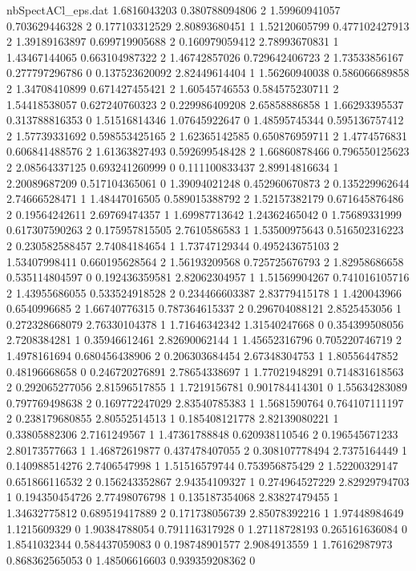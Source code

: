 \begin{filecontents}{nbSpectACl_eps.dat}
1.6816043203 0.380788094806 2
1.59960941057 0.703629446328 2
0.177103312529 2.80893680451 1
1.52120605799 0.477102427913 2
1.39189163897 0.699719905688 2
0.160979059412 2.78993670831 1
1.43467144065 0.663104987322 2
1.46742857026 0.729642406723 2
1.73533856167 0.277797296786 0
0.137523620092 2.82449614404 1
1.56260940038 0.586066689858 2
1.34708410899 0.671427455421 2
1.60545746553 0.584575230711 2
1.54418538057 0.627240760323 2
0.229986409208 2.65858886858 1
1.66293395537 0.313788816353 0
1.51516814346 1.07645922647 0
1.48595745344 0.595136757412 2
1.57739331692 0.598553425165 2
1.62365142585 0.650876959711 2
1.4774576831 0.606841488576 2
1.61363827493 0.592699548428 2
1.66860878466 0.796550125623 2
2.08564337125 0.693241260999 0
0.111100833437 2.89914816634 1
2.20089687209 0.517104365061 0
1.39094021248 0.452960670873 2
0.135229962644 2.74666528471 1
1.48447016505 0.589015388792 2
1.52157382179 0.671645876486 2
0.19564242611 2.69769474357 1
1.69987713642 1.24362465042 0
1.75689331999 0.617307590263 2
0.175957815505 2.7610586583 1
1.53500975643 0.516502316223 2
0.230582588457 2.74084184654 1
1.73747129344 0.495243675103 2
1.53407998411 0.660195628564 2
1.56193209568 0.725725676793 2
1.82958686658 0.535114804597 0
0.192436359581 2.82062304957 1
1.51569904267 0.741016105716 2
1.43955686055 0.533524918528 2
0.234466603387 2.83779415178 1
1.420043966 0.6540996685 2
1.66740776315 0.787364615337 2
0.296704088121 2.8525453056 1
0.272328668079 2.76330104378 1
1.71646342342 1.31540247668 0
0.354399508056 2.7208384281 1
0.35946612461 2.82690062144 1
1.45652316796 0.705220746719 2
1.4978161694 0.680456438906 2
0.206303684454 2.67348304753 1
1.80556447852 0.48196668658 0
0.246720276891 2.78654338697 1
1.77021948291 0.714831618563 2
0.292065277056 2.81596517855 1
1.7219156781 0.901784414301 0
1.55634283089 0.797769498638 2
0.169772247029 2.83540785383 1
1.5681590764 0.764107111197 2
0.238179680855 2.80552514513 1
0.185408121778 2.82139080221 1
0.33805882306 2.7161249567 1
1.47361788848 0.620938110546 2
0.196545671233 2.80173577663 1
1.46872619877 0.437478407055 2
0.308107778494 2.7375164449 1
0.140988514276 2.7406547998 1
1.51516579744 0.753956875429 2
1.52200329147 0.651866116532 2
0.156243352867 2.94354109327 1
0.274964527229 2.82929794703 1
0.194350454726 2.77498076798 1
0.135187354068 2.83827479455 1
1.34632775812 0.689519417889 2
0.171738056739 2.85078392216 1
1.97448984649 1.1215609329 0
1.90384788054 0.791116317928 0
1.27118728193 0.265161636084 0
1.8541032344 0.584437059083 0
0.198748901577 2.9084913559 1
1.76162987973 0.868362565053 0
1.48506616603 0.939359208362 0

\end{filecontents}
